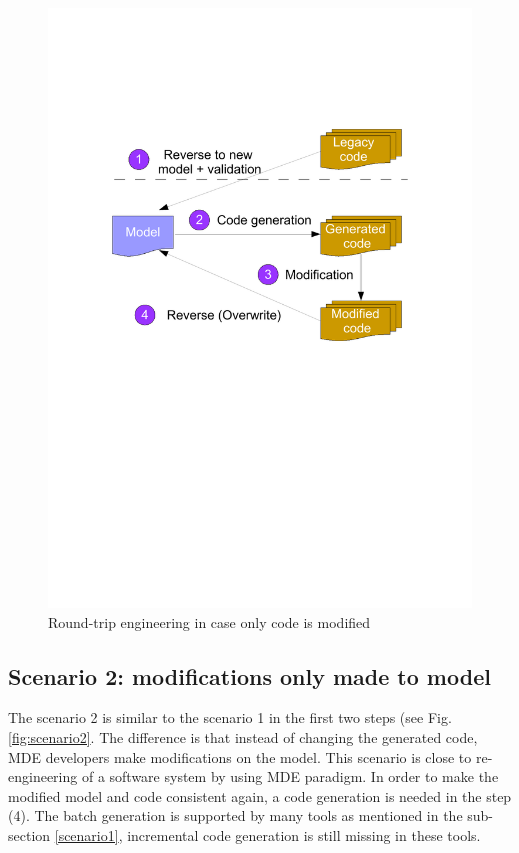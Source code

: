 \begin{figure}
\centering
\includegraphics[height = 0.20\textheight, trim = 90 370 60 170, clip]{figures/scenario1}
\caption{\label{fig:scenario1}Round-trip engineering in case only code is modified} 
\end{figure}

\subsection{Scenario 2: modifications only made to model}
\label{scenario2}
The scenario 2 is similar to the scenario 1 in the first two steps (see Fig. \ref{fig:scenario2}. The difference is that instead of changing the generated code, MDE developers make modifications on the model. This scenario is close to re-engineering \cite{Chikofsky1990} of a software system by using MDE paradigm. In order to make the modified model and code consistent again, a code generation is needed in the step (4). The batch generation is supported by many tools as mentioned in the sub-section \ref{scenario1}, incremental code generation is still missing in these tools.  

